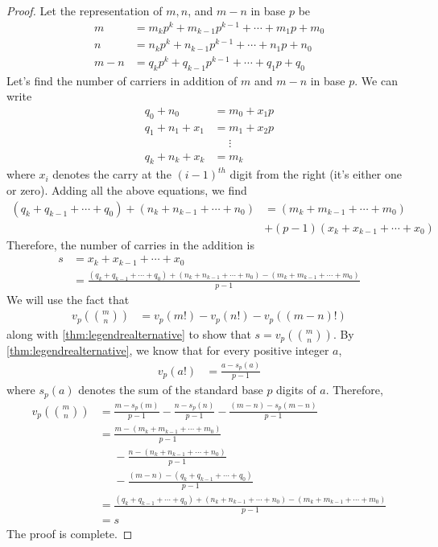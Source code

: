 \documentclass{subfile}
\begin{document}
\begin{proof}
	Let the representation of $m, n$, and $m-n$ in base $p$ be
	\begin{align*}
		m   &= m_kp^k+m_{k-1}p^{k-1}+\cdots +m_1p+m_0\\
		n   &= n_kp^k+n_{k-1}p^{k-1}+\cdots +n_1p+n_0\\
		m-n &= q_kp^k+q_{k-1}p^{k-1}+\cdots +q_1p+q_0
	\end{align*}
	Let's find the number of carriers in addition of $m$ and $m-n$ in base $p$. We can write
	\begin{align*}
		q_0+n_0  &= m_0 + x_1 p\\
		q_1+n_1+x_1&= m_1 + x_2p\\
		&\phantom{=}\vdots\\
		q_k+n_k+x_k&= m_k
	\end{align*}
	where $x_i$ denotes the carry at the $(i-1)^{th}$ digit from the right (it's either one or zero). Adding all the above equations, we find
	\begin{align*}
		(q_k+q_{k-1}+\cdots+q_0)+(n_k+n_{k-1}+\cdots+n_0) &= (m_k+m_{k-1}+ \cdots+m_0)\\&+(p-1)(x_k+x_{k-1}+\cdots+x_0)
	\end{align*}
	Therefore, the number of carries in the addition is
	\begin{align*}
		s &= x_k+x_{k-1}+\cdots+x_0 \\
		&= \frac{(q_k+q_{k-1}+\cdots+q_0) + (n_k+n_{k-1}+\cdots+n_0) - (m_k+m_{k-1}+\cdots+m_0)}{p-1}
	\end{align*}
	We will use the fact that
	\begin{align*}
		v_p\left( \binom{m}{n}\right) &= v_p(m!)-v_p(n!)-v_p((m-n)!)
	\end{align*}
	along with \autoref{thm:legendrealternative} to show that $s=v_p\left( \binom{m}{n}\right)$. By \autoref{thm:legendrealternative}, we know that for every positive integer $a$,
	\begin{align*}
		v_p(a!) & =\frac{a-s_p(a)}{p-1}
	\end{align*}
	where $s_p(a)$ denotes the sum of the standard base $p$ digits of $a$. Therefore,
	\begin{align*}
		v_p\left( \binom{m}{n}\right)
		& = \frac{m-s_p(m)}{p-1}-\frac{n-s_p(n)}{p-1}-\frac{(m-n)-s_p(m-n)}{p-1}\\
		& = \frac{m-(m_k+m_{k-1}+\cdots+m_0)}{p-1}\\
		& \phantom{=}-\frac{n-(n_k+n_{k-1}+\cdots+n_0)}{p-1}\\
		& \phantom{=}-\frac{(m-n)-(q_k+q_{k-1}+\cdots+q_0)}{p-1}\\
		& = \frac{(q_k+q_{k-1}+\cdots+q_0) + (n_k+n_{k-1}+\cdots+n_0) - (m_k+m_{k-1}+\cdots+m_0)}{p-1}\\
		&=s
	\end{align*}
	The proof is complete.
\end{proof}
\end{document}
